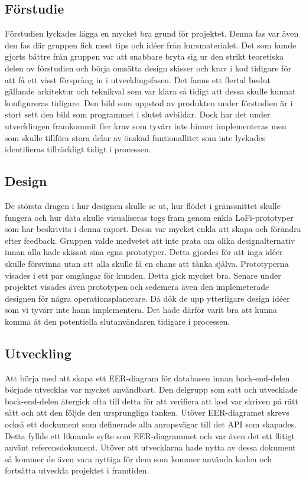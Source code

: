 \subsection{Förstudie}
Förstudien lyckades lägga en mycket bra grund för projektet. Denna fas var även den fas där gruppen fick mest tips och idéer från kursmaterialet. Det som kunde gjorts bättre från gruppen var att snabbare bryta sig ur den strikt teoretiska delen av förstudien och börja omsätta design skisser och krav i kod tidigare för att få ett visst försprång in i utvecklingsfasen. Det fanns ett flertal beslut gällande arkitektur och teknikval som var klara så tidigt att dessa skulle kunnat konfigureras tidigare. Den bild som uppstod av produkten under förstudien är i stort sett den bild som programmet i slutet avbildar. Dock har det under utvecklingen framkommit fler krav som tyvärr inte hinner implementeras men som skulle tillföra stora delar av önskad funtionallitet som inte lyckades identifieras tillräckligt tidigt i processen.

\subsection{Design}
De största dragen i hur designen skulle se ut, hur flödet i gränssnittet skulle fungera och hur data skulle visualiseras togs fram genom enkla LoFi-prototyper som har beskrivits i denna raport. Dessa var mycket enkla att skapa och förändra efter feedback. Gruppen valde medvetet att inte prata om olika designalternativ innan alla hade skissat sina egna prototyper. Detta gjordes för att inga idéer skulle försvinna utan att alla skulle få en chans att tänka själva. Prototyperna visades i ett par omgångar för kunden. Detta gick mycket bra. Senare under projektet visades även prototypen och sedemera även den implemeterade designen för några operationsplanerare. Då dök de upp ytterligare design idéer som vi tyvärr inte hann implementera. Det hade därför varit bra att kunna komma åt den potentiella slutanvändaren tidigare i processen.


\subsection{Utveckling}

Att börja med att skapa ett EER-diagram för databasen innan back-end-delen började utvecklas var mycket användbart. Den delgrupp som satt och utvecklade back-end-delen återgick ofta till detta för att verifiera att kod var skriven på rätt sätt och att den följde den ursprungliga tanken. Utöver EER-diagramet skrevs också ett dockument som definerade alla anropsvägar till det API som skapades. Detta fyllde ett liknande syfte som EER-diagrammet och var även det ett flitigt använt referensdokument. Utöver att utvecklarna hade nytta av dessa dokument så kommer de även vara nyttiga för dem som kommer använda koden och fortsätta utveckla projektet i framtiden. 

